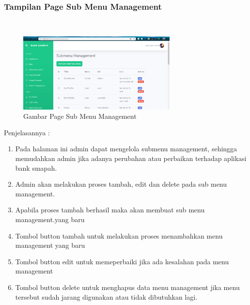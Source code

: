 \subsubsection{Tampilan Page Sub Menu Management}
\hfill\\
	\begin{figure}[H]
		\includegraphics[width=8cm]{figures/analisis/26.png}
		\centering
		\caption{Gambar Page Sub Menu Management}
	\end{figure}
Penjelasannya :
\begin{enumerate}
\item Pada halaman ini admin dapat mengelola submenu management, sehingga memudahkan admin jika adanya perubahan atau perbaikan terhadap aplikasi bank smapah.
\item Admin akan melakukan proses tambah, edit dan delete pada sub menu management.
\item Apabila proses tambah berhasil maka akan membuat sub menu management.yang baru
\item Tombol button tambah untuk melakukan proses menambahkan menu management yang baru
\item Tombol button edit untuk memeperbaiki jika ada kesalahan pada menu management
\item Tombol button delete untuk menghapus data menu management jika menu tersebut sudah jarang digunakan atau tidak dibutuhkan lagi.
\end{enumerate}

